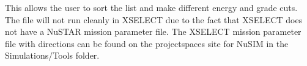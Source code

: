 This allows the user to sort the list and make different energy and grade cuts. The file will not run cleanly in XSELECT due to the fact that XSELECT does not have a NuSTAR mission parameter file. The XSELECT mission parameter file with directions can be found on the projectspaces site for NuSIM in the Simulations/Tools folder.

%
